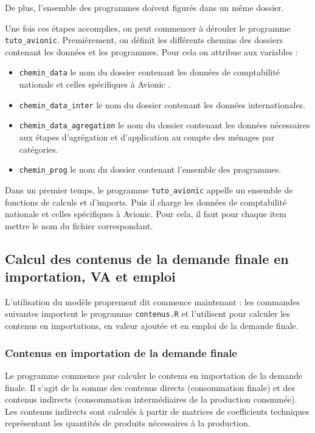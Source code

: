 \documentclass[a4paper,french,11pt]{article}
\begin{document}
De plus, l'ensemble des programmes doivent figur\'es dans un m\^eme dossier.

Une fois ces \'etapes accomplies, on peut commencer \`a d\'erouler le programme \verb|tuto_avionic|. Premi\`erement, on d\'efinit les diff\'erents chemins des dossiers contenant les donn\'ees et les programmes. Pour cela on attribue aux variables :

\begin{itemize}
    \item \verb|chemin_data| le nom du dossier contenant les donn\'ees de comptabilit\'e nationale et celles sp\'ecifiques \`a Avionic .
    \item \verb|chemin_data_inter| le nom du dossier contenant les donn\'ees internationales.
    \item \verb|chemin_data_agregation| le nom du dossier contenant les donn\'ees n\'ecessaires aux \'etapes d'agr\'egation et d'application au compte des m\'enages par cat\'egories.
    \item \verb|chemin_prog| le nom du dossier contenant l'ensemble des programmes.
\end{itemize}

Dans un premier temps, le programme \verb|tuto_avionic| appelle un ensemble de fonctions de calculs et d'imports. Puis il charge les donn\'ees de comptabilit\'e nationale et celles sp\'ecifiques \`a Avionic. Pour cela, il faut pour chaque item mettre le nom du fichier correspondant.


\subsection{Calcul des contenus de la demande finale en importation, VA et emploi}

L'utilisation du mod\`ele proprement dit commence maintenant : les commandes suivantes importent le programme \verb|contenus.R| et l'utilisent pour calculer les contenus en importations, en valeur ajout\'ee et en emploi de la demande finale.

\subsubsection{Contenus en importation de la demande finale}
Le programme commence par calculer le contenu en importation de la demande finale. Il s'agit de la somme des contenus directs (consommation finale) et des contenus indirects (consommation interm\'ediaires de la production consmm\'ee). Les contenus indirects sont calcul\'es \`a partir de matrices de coefficients techniques repr\'esentant les quantit\'es de produits n\'ecessaires \`a la production.
\end{document}
